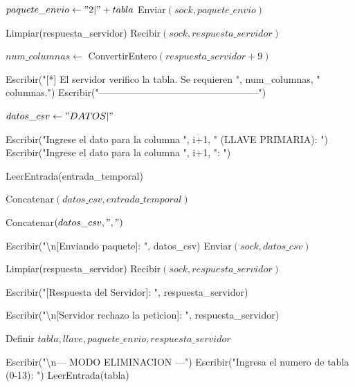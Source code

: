 \begin{tcolorbox}[colback=white, colframe=azul_unam, 
title=Pseudocódigo: cliente.c, breakable]
\begin{algorithmic}[1]
\State $paquete\_envio \gets "2|" + tabla$
\State Enviar$(sock, paquete\_envio)$

\State Limpiar(respuesta\_servidor)
\State Recibir$(sock, respuesta\_servidor)$


    \State $num\_columnas \gets$ ConvertirEntero$(respuesta\_servidor + 9)$

    \State Escribir("[*] El servidor verifico la tabla. Se requieren ", num\_columnas, " columnas.")
    \State Escribir("--------------------------------------------------")

    \State $datos\_csv \gets "DATOS|"$


            \State Escribir("Ingrese el dato para la columna ", i+1, " (LLAVE PRIMARIA): ")
        \Else
            \State Escribir("Ingrese el dato para la columna ", i+1, ": ")
        \EndIf

        \State LeerEntrada(entrada\_temporal)

        \State Concatenar$(datos\_csv, entrada\_temporal)$

            \State Concatenar$(datos\_csv, ",")$
        \EndIf

    \EndFor

    \State Escribir("\textbackslash n[Enviando paquete]: ", datos\_csv)
    \State Enviar$(sock, datos\_csv)$

    \State Limpiar(respuesta\_servidor)
    \State Recibir$(sock, respuesta\_servidor)$

    \State Escribir("[Respuesta del Servidor]: ", respuesta\_servidor)

\Else

    \State Escribir("\textbackslash n[Servidor rechazo la peticion]: ", respuesta\_servidor)

\EndIf

\EndProcedure

\vspace{0.3cm}



\State Definir $tabla, llave, paquete\_envio, respuesta\_servidor$

\State Escribir("\textbackslash n--- MODO ELIMINACION ---")
\State Escribir("Ingresa el numero de tabla (0-13): ")
\State LeerEntrada(tabla)


\end{algorithmic}
\end{tcolorbox}
